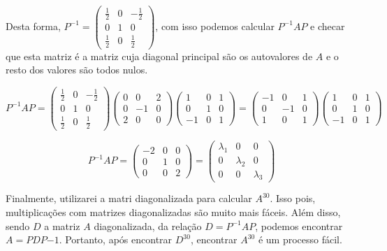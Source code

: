 \begin{enumerate}
	Desta forma, $P^{-1} = 
	\begin{pmatrix}
		\frac{1}{2} & 0 & -\frac{1}{2}\\
		0 & 1 & 0\\
		\frac{1}{2} & 0 & \frac{1}{2}
	\end{pmatrix}$, com isso podemos calcular $P^{-1}AP$ e checar
	que esta matriz é a matriz cuja diagonal principal são os autovalores de $A$
	e o resto dos valores são todos nulos.
	
	$$
	P^{-1}AP = 
	\begin{pmatrix}
		\frac{1}{2} & 0 & -\frac{1}{2}\\
		0 & 1 & 0\\
		\frac{1}{2} & 0 & \frac{1}{2}
	\end{pmatrix}
	\begin{pmatrix}
		0 & 0 & 2\\
		0 & -1 & 0\\
		2 & 0 & 0
	\end{pmatrix}
	\begin{pmatrix}
		1 & 0 & 1\\
		0 & 1 & 0\\
		-1 & 0 & 1
	\end{pmatrix}
	=
	\begin{pmatrix}
		-1 & 0 & 1\\
		0 & -1 & 0\\
		1 & 0 & 1
	\end{pmatrix}
	\begin{pmatrix}
		1 & 0 & 1\\
		0 & 1 & 0\\
		-1 & 0 & 1
	\end{pmatrix}
	$$
	
	$$
	P^{-1}AP =
	\begin{pmatrix}
		-2 & 0 & 0\\
		0 & 1 & 0\\
		0 & 0 & 2
	\end{pmatrix}
	=
	\begin{pmatrix}
		\lambda_1 & 0 & 0\\
		0 & \lambda_2 & 0\\
		0 & 0 & \lambda_3
	\end{pmatrix}
	$$
	
	Finalmente, utilizarei a matri diagonalizada para
	calcular $A^{30}$. Isso pois, multiplicações com
	matrizes diagonalizadas são muito mais fáceis.
	Além disso, sendo $D$ a matriz $A$ diagonalizada, da
	relação $D = P^{-1}AP$, podemos encontrar $A = PDP{-1}$.
	Portanto, após encontrar $D^{30}$, encontrar $A^{30}$ é um processo fácil.
	

\end{enumerate}
